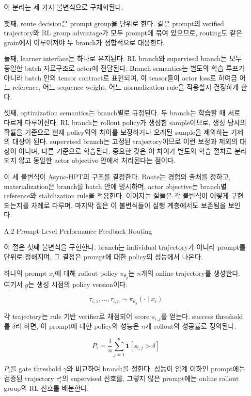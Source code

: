 이 분리는 세 가지 불변식으로 구체화된다.

첫째, route decision은 prompt group을 단위로 한다. 같은 prompt의 verified trajectory와 RL group advantage가 모두 prompt에 묶여 있으므로, routing도 같은 grain에서 이루어져야 두 branch가 정합적으로 대응한다.

둘째, learner interface는 하나로 유지된다. RL branch와 supervised branch는 모두 동일한 batch 자료구조로 actor에 전달된다. Branch semantics는 별도의 학습 루프가 아니라 batch 안의 tensor contract로 표현되며, 이 tensor들이 actor loss로 하여금 어느 reference, 어느 sequence weight, 어느 normalization rule을 적용할지 결정하게 한다.

셋째, optimization semantics는 branch별로 규정된다. 두 branch는 학습할 때 서로 다르게 다루어진다. RL branch는 rollout policy가 생성한 sample이므로, 생성 당시의 확률을 기준으로 현재 policy와의 차이를 보정하거나 오래된 sample을 제외하는 기제의 대상이 된다. supervised branch는 고정된 trajectory이므로 이런 보정과 제외의 대상이 아니며, 다른 기준으로 학습된다. 중요한 것은 이 차이가 별도의 학습 절차로 분리되지 않고 동일한 actor objective 안에서 처리된다는 점이다.

이 세 불변식이 Async-HPT의 구조를 결정한다. Route는 경험의 출처를 정하고, materialization은 branch를 batch 안에 명시하며, actor objective는 branch별 reference와 stabilization rule을 적용한다. 이어지는 절들은 각 불변식이 어떻게 구현되는지를 차례로 다루며, 마지막 절은 이 불변식들이 실행 계층에서도 보존됨을 보인다.

A.2 Prompt-Level Performance Feedback Routing


이 절은 첫째 불변식을 구현한다. branch는 individual trajectory가 아니라 prompt를 단위로 정해지며, 그 결정은 prompt에 대한 policy의 성능에서 나온다.

하나의 prompt $x_i$에 대해 rollout policy $\pi_{\theta_g}$는 $n$개의 online trajectory를 생성한다. 여기서 $g$는 생성 시점의 policy version이다.

$$\tau_{i,1}, \ldots, \tau_{i,n} \sim \pi_{\theta_g}(\cdot \mid x_i)$$

각 trajectory는 rule 기반 verifier로 채점되어 score $s_{i,j}$를 얻는다. success threshold를 $\delta$라 하면, 이 prompt에 대한 policy의 성능은 $n$개 rollout의 성공률로 정의된다.

$$P_i = \frac{1}{n} \sum_{j=1}^{n} \mathbf{1}[s_{i,j} > \delta]$$

$P_i$를 gate threshold $\gamma$와 비교하여 branch를 정한다. 성능이 임계 이하인 prompt에는 검증된 trajectory $\tau_i^\star$의 supervised 신호를, 그렇지 않은 prompt에는 online rollout group의 RL 신호를 배분한다.


